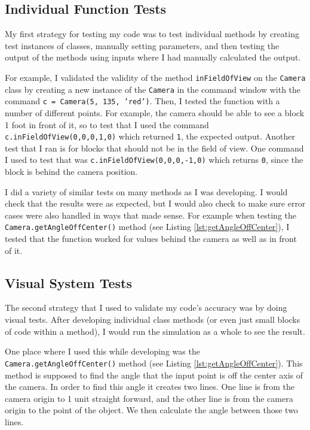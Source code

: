 \documentclass[12pt]{article}
\begin{document}
\subsection{Individual Function Tests}
My first strategy for testing my code was to test individual methods by creating test instances of classes, manually setting parameters, and then testing the output of the methods using inputs where I had manually calculated the output.

For example, I validated the validity of the method \texttt{inFieldOfView} on the \texttt{Camera} class by creating a new instance of the \texttt{Camera} in the command window with the command \texttt{c = Camera(5, 135, 'red')}. Then, I tested the function with a number of different points. For example, the camera should be able to see a block 1 foot in front of it, so to test that I used the command \texttt{c.inFieldOfView(0,0,0,1,0)} which returned \texttt{1}, the expected output. Another test that I ran is for blocks that should not be in the field of view. One command I used to test that was \texttt{c.inFieldOfView(0,0,0,-1,0)} which returns \texttt{0}, since the block is behind the camera position.

I did a variety of similar tests on many methods as I was developing. I would check that the results were as expected, but I would also check to make sure error cases were also handled in ways that made sense. For example when testing the \texttt{Camera.getAngleOffCenter()} method (see Listing \ref{lst:getAngleOffCenter}), I tested that the function worked for values behind the camera as well as in front of it.

\subsection{Visual System Tests}
The second strategy that I used to validate my code's accuracy was by doing visual tests. After developing individual class methods (or even just small blocks of code within a method), I would run the simulation as a whole to see the result.

One place where I used this while developing was the \texttt{Camera.getAngleOffCenter()} method (see Listing \ref{lst:getAngleOffCenter}). This method is supposed to find the angle that the input point is off the center axis of the camera. In order to find this angle it creates two lines. One line is from the camera origin to 1 unit straight forward, and the other line is from the camera origin to the point of the object. We then calculate the angle between those two lines.
\end{document}
